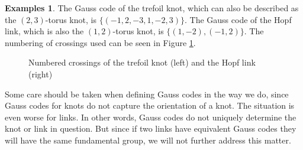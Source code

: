 \documentclass[a4paper]{article}
\theoremstyle{definition}
\newtheorem{examples}[theorem]{Examples}
\begin{document}
\begin{examples}
The Gauss code of the trefoil knot, which can also be described as the $(2,3)$-torus knot, is $\{(-1, 2, -3, 1, -2, 3)\}$. The Gauss code of the Hopf link, which is also the $(1, 2)$-torus knot, is $\{(1, -2), (-1, 2)\}$. The numbering of crossings used can be seen in Figure \ref{fig:numbered-crossings}.

\begin{figure}[ht]
\label{fig:numbered-crossings}
\centering
\begin{minipage}{.5\textwidth}
 \centering
{}
\end{minipage}%
\begin{minipage}{.5\textwidth}
 \centering
{}
\end{minipage}

\caption{Numbered crossings of the trefoil knot (left) and the Hopf link (right)}
\end{figure}


\end{examples}

Some care should be taken when defining Gauss codes in the way we do, since Gauss codes for knots do not capture the orientation of a knot. The situation is even worse for links. In other words, Gauss codes do not uniquely determine the knot or link in question. But since if two links have equivalent Gauss codes they will have the same fundamental group, we will not further address this matter.
\end{document}
